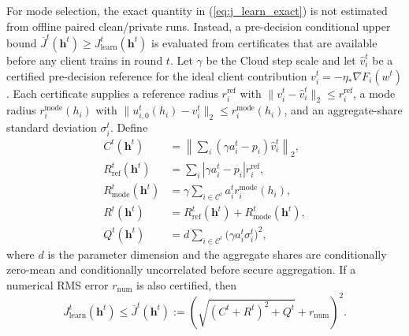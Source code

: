 \documentclass[5p,times]{elsarticle}
\theoremstyle{plain}
\theoremstyle{definition}
\theoremstyle{remark}
\begin{document}
For mode selection, the exact quantity
in (\ref{eq:j_learn_exact}) is not estimated
from offline paired clean/private runs.
Instead, a pre-decision conditional upper bound
$\overline J^t(\mathbf h^t)\ge
J_{\mathrm{learn}}^t(\mathbf h^t)$
is evaluated from certificates that are available
before any client trains in round $t$.
Let $\gamma$ be the Cloud step scale and let
$\hat v_i^t$ be a certified pre-decision reference
for the ideal client contribution
$v_i^t=-\eta_*\nabla F_i(w^t)$.
Each certificate supplies a reference radius
$r_i^{\mathrm{ref}}$ with
$\|v_i^t-\hat v_i^t\|_2\le r_i^{\mathrm{ref}}$,
a mode radius $r_i^{\mathrm{mode}}(h_i)$ with
$\|u_{i,0}^t(h_i)-v_i^t\|_2\le r_i^{\mathrm{mode}}(h_i)$,
and an aggregate-share standard deviation
$\sigma_i^t$. Define
\begin{align}
C^t(\mathbf h^t)&=
\left\|\sum_i(\gamma a_i^t-p_i)\hat v_i^t\right\|_2,
\label{eq:online_center}\\
R_{\mathrm{ref}}^t(\mathbf h^t)&=
\sum_i|\gamma a_i^t-p_i|r_i^{\mathrm{ref}},
\label{eq:online_ref_radius}\\
R_{\mathrm{mode}}^t(\mathbf h^t)&=
\gamma\sum_{i\in\mathcal C^t}
a_i^tr_i^{\mathrm{mode}}(h_i),
\label{eq:online_mode_radius}\\
R^t(\mathbf h^t)&=
R_{\mathrm{ref}}^t(\mathbf h^t)
+R_{\mathrm{mode}}^t(\mathbf h^t),
\label{eq:online_radius}\\
Q^t(\mathbf h^t)&=
d\sum_{i\in\mathcal C^t}
\bigl(\gamma a_i^t\sigma_i^t\bigr)^2,
\label{eq:online_q}
\end{align}
where $d$ is the parameter dimension and the
aggregate shares are conditionally zero-mean and
conditionally uncorrelated before secure aggregation.
If a numerical RMS error $r_{\mathrm{num}}$ is
also certified, then
\begin{equation}
\boxed{
J_{\mathrm{learn}}^t(\mathbf h^t)
\le\overline J^t(\mathbf h^t)
:=\left(
\sqrt{\left(C^t+R^t\right)^2+Q^t}
+r_{\mathrm{num}}
\right)^2.
}
\label{eq:online_upper_bound}
\end{equation}
\end{document}
